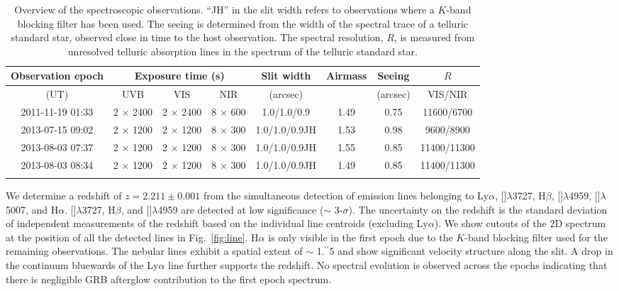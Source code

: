 \documentclass[referee]{aa}
\newcommand{\farc}{\hbox{$.\!\!^{\prime\prime}$}}
\newcommand{\lya}{Ly$\alpha$}
\newcommand{\hb}{H$\beta$}
\newcommand{\ha}{H$\alpha$}
\newcommand{\oii}{[\ion{O}{ii}]}
\newcommand{\oiii}{[\ion{O}{iii}]}
\begin{document}
\begin{table*}[!ht]
	
	\centering
	\caption{Overview of the spectroscopic observations. ``JH'' in the slit width refers to observations where a $K$-band blocking filter has been used. The seeing is determined from the width of the spectral trace of a telluric standard star, observed close in time to the host observation. The spectral resolution, $R$, is measured from unresolved telluric absorption lines in the spectrum of the telluric standard star. \label{tab:spec_overview}}
	\begin{tabular}{cccccccc}
		\hline\hline
		{Observation epoch} &  \multicolumn{3}{c}{Exposure time (s)} & Slit width & Airmass & Seeing & $R$   \\ [1.5pt]
		\hline
		(UT) & UVB  & VIS & NIR &  (arcsec)   & {} & (arcsec)  & {VIS/NIR}  \\ [1.5pt]
		\hline
		2011-11-19 01:33 & 2 $\times$ 2400 & 2 $\times$ 2400 & 8 $\times$ 600 & 1.0/1.0/0.9 & 1.49 & 0.75 & 11600/6700 \\
		2013-07-15 09:02 & 2 $\times$ 1200 & 2 $\times$ 1200 & 8 $\times$ 300 & 1.0/1.0/0.9JH & 1.53 & 0.98 & 9600/8900 \\
		2013-08-03 07:37 & 2 $\times$ 1200 & 2 $\times$ 1200 & 8 $\times$ 300 & 1.0/1.0/0.9JH & 1.55 & 0.85 & 11400/11300 \\
		2013-08-03 08:34 & 2 $\times$ 1200 & 2 $\times$ 1200 & 8 $\times$ 300 & 1.0/1.0/0.9JH & 1.49 & 0.85 & 11400/11300 \\
		
		\hline\noalign{\smallskip}
		
	\end{tabular}
	
\end{table*}

We determine a redshift of $z = 2.211 \pm 0.001$ from the simultaneous detection
of emission lines belonging to \lya, \oii$\lambda$3727, \hb, \oiii$\lambda$4959,
\oiii$\lambda$5007, and \ha. \oii$\lambda$3727, \hb{}, and \oiii$\lambda$4959
are detected at low significance ($\sim$ 3-$\sigma$). The uncertainty on the
redshift is the standard deviation of independent measurements of the redshift
based on the individual line centroids (excluding \lya). We show cutouts of the
2D spectrum at the position of all the detected lines in Fig.~\ref{fig:line}. 
\ha{} is only visible in the first epoch due to the $K$-band blocking filter
used for the remaining observations. The nebular lines exhibit a spatial extent
of $\sim$ 1\farc5 and show significant velocity structure along the slit. A drop
in the continuum bluewards of the \lya{} line further supports the redshift. No
spectral evolution is observed across the epochs indicating that there is
negligible GRB afterglow contribution to the first epoch spectrum.
\end{document}
